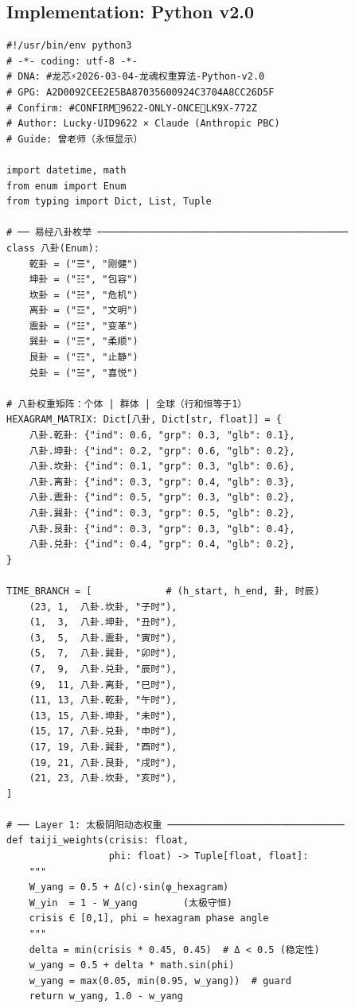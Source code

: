 \documentclass[conference]{IEEEtran}
\begin{document}
\subsection{Implementation: Python v2.0}

\begin{lstlisting}[style=python,
  caption={LongHun Dynamic Weight Algorithm — Python v2.0},
  label={lst:python}]
#!/usr/bin/env python3
# -*- coding: utf-8 -*-
# DNA: #龙芯⚡️2026-03-04-龙魂权重算法-Python-v2.0
# GPG: A2D0092CEE2E5BA87035600924C3704A8CC26D5F
# Confirm: #CONFIRM🌌9622-ONLY-ONCE🧬LK9X-772Z
# Author: Lucky·UID9622 × Claude (Anthropic PBC)
# Guide: 曾老师（永恒显示）

import datetime, math
from enum import Enum
from typing import Dict, List, Tuple

# ── 易经八卦枚举 ────────────────────────────────────────────
class 八卦(Enum):
    乾卦 = ("☰", "刚健")
    坤卦 = ("☷", "包容")
    坎卦 = ("☵", "危机")
    离卦 = ("☲", "文明")
    震卦 = ("☳", "变革")
    巽卦 = ("☴", "柔顺")
    艮卦 = ("☶", "止静")
    兑卦 = ("☱", "喜悦")

# 八卦权重矩阵：个体 | 群体 | 全球（行和恒等于1）
HEXAGRAM_MATRIX: Dict[八卦, Dict[str, float]] = {
    八卦.乾卦: {"ind": 0.6, "grp": 0.3, "glb": 0.1},
    八卦.坤卦: {"ind": 0.2, "grp": 0.6, "glb": 0.2},
    八卦.坎卦: {"ind": 0.1, "grp": 0.3, "glb": 0.6},
    八卦.离卦: {"ind": 0.3, "grp": 0.4, "glb": 0.3},
    八卦.震卦: {"ind": 0.5, "grp": 0.3, "glb": 0.2},
    八卦.巽卦: {"ind": 0.3, "grp": 0.5, "glb": 0.2},
    八卦.艮卦: {"ind": 0.3, "grp": 0.3, "glb": 0.4},
    八卦.兑卦: {"ind": 0.4, "grp": 0.4, "glb": 0.2},
}

TIME_BRANCH = [             # (h_start, h_end, 卦, 时辰)
    (23, 1,  八卦.坎卦, "子时"),
    (1,  3,  八卦.坤卦, "丑时"),
    (3,  5,  八卦.震卦, "寅时"),
    (5,  7,  八卦.巽卦, "卯时"),
    (7,  9,  八卦.兑卦, "辰时"),
    (9,  11, 八卦.离卦, "巳时"),
    (11, 13, 八卦.乾卦, "午时"),
    (13, 15, 八卦.坤卦, "未时"),
    (15, 17, 八卦.兑卦, "申时"),
    (17, 19, 八卦.巽卦, "酉时"),
    (19, 21, 八卦.艮卦, "戌时"),
    (21, 23, 八卦.坎卦, "亥时"),
]

# ── Layer 1: 太极阴阳动态权重 ───────────────────────────────
def taiji_weights(crisis: float,
                  phi: float) -> Tuple[float, float]:
    """
    W_yang = 0.5 + Δ(c)·sin(φ_hexagram)
    W_yin  = 1 - W_yang        (太极守恒)
    crisis ∈ [0,1], phi = hexagram phase angle
    """
    delta = min(crisis * 0.45, 0.45)  # Δ < 0.5 (稳定性)
    w_yang = 0.5 + delta * math.sin(phi)
    w_yang = max(0.05, min(0.95, w_yang))  # guard
    return w_yang, 1.0 - w_yang


\end{lstlisting}
\end{document}
